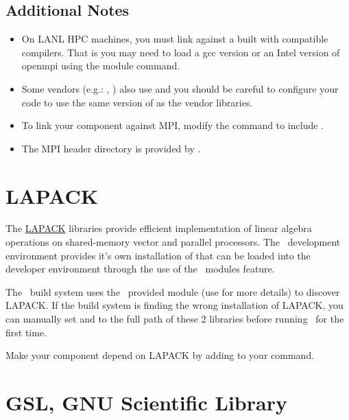\subsection{Additional Notes}
\begin{itemize}
\item On LANL HPC machines, you must link against a   built with compatible compilers.  That is you may need to load a gcc version or an Intel version of openmpi using the module command.
\item Some vendors (e.g.: , ) also use  and you should be careful to configure your code to use the same version of  as the vendor libraries. 
\item To link your component against MPI, modify the  command to include .
\item The MPI header directory is provided by .
\end{itemize}


\section{LAPACK}
\label{appsec:lapack}

The \href{http://www.netlib.org/lapack/}{LAPACK} libraries provide efficient implementation of linear algebra operations on shared-memory vector and parallel processors. The \draco\ development environment provides it's own installation of  that can be loaded into the developer environment through the use of the \draco\ modules feature.

The \draco\ build system uses the \cmake\ provided  module (use  for more details) to discover LAPACK.  If the build system is finding the wrong installation of LAPACK, you can manually set  and  to the full path of these 2 libraries before running \cmake\ for the first time.

Make your component depend on LAPACK by adding  to your  command.


\section{GSL, GNU Scientific Library}
\label{appsec:gsl}

